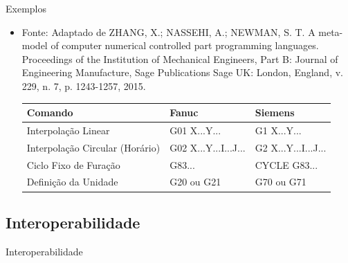 \documentclass[aspectratio=169]{beamer}
\begin{document}
{\begin{frame}{Exemplos}
  \begin{itemize}
    \item {
      Fonte: Adaptado de ZHANG, X.; NASSEHI, A.; NEWMAN, S. T. A meta-model of computer numerical
      controlled part programming languages. Proceedings of the Institution of
      Mechanical Engineers, Part B: Journal of Engineering Manufacture, Sage
      Publications Sage UK: London, England, v. 229, n. 7, p. 1243-1257, 2015.
      \begin{table}[H]
        \centering    
        {\begin{tabular}{p{4.3cm}|p{2.6cm}|p{2.4cm}}
          \hline
          \bfseries{\footnotesize{Comando}} & 
          \bfseries{\footnotesize{Fanuc}} & 
          \bfseries{\footnotesize{Siemens}} \\
      
          \hline
          \footnotesize{Interpolação Linear} & 
          \footnotesize{G01 X...Y...} & 
          \footnotesize{G1 X...Y...} \\
      
          \hline
          \footnotesize{Interpolação Circular (Horário)} & 
          \footnotesize{G02 X...Y...I...J...} & 
          \footnotesize{G2 X...Y...I...J...} \\
      
          \hline
          \footnotesize{Ciclo Fixo de Furação} & 
          \footnotesize{G83...} & 
          \footnotesize{CYCLE G83...} \\
      
          \hline
          \footnotesize{Definição da Unidade} & 
          \footnotesize{G20 ou G21 } & 
          \footnotesize{G70 ou G71} \\

          \hline

        \end{tabular}}
      \end{table}
    }    
  \end{itemize}
\end{frame}


\subsection{Interoperabilidade}

\begin{frame}{Interoperabilidade}

  \begin{itemize}
    

\end{itemize}
\end{frame}}
\end{document}
